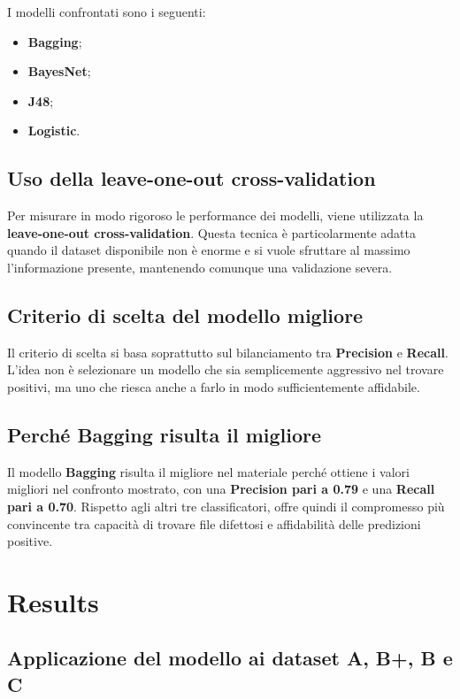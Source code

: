 I modelli confrontati sono i seguenti:

\begin{itemize}
    \item \textbf{Bagging};
    \item \textbf{BayesNet};
    \item \textbf{J48};
    \item \textbf{Logistic}.
\end{itemize}

\subsection{Uso della leave-one-out cross-validation}

Per misurare in modo rigoroso le performance dei modelli, viene utilizzata la \textbf{leave-one-out cross-validation}. Questa tecnica è particolarmente adatta quando il dataset disponibile non è enorme e si vuole sfruttare al massimo l'informazione presente, mantenendo comunque una validazione severa.

\subsection{Criterio di scelta del modello migliore}

Il criterio di scelta si basa soprattutto sul bilanciamento tra \textbf{Precision} e \textbf{Recall}. L'idea non è selezionare un modello che sia semplicemente aggressivo nel trovare positivi, ma uno che riesca anche a farlo in modo sufficientemente affidabile.

\subsection{Perché Bagging risulta il migliore}

Il modello \textbf{Bagging} risulta il migliore nel materiale perché ottiene i valori migliori nel confronto mostrato, con una \textbf{Precision pari a 0.79} e una \textbf{Recall pari a 0.70}. Rispetto agli altri tre classificatori, offre quindi il compromesso più convincente tra capacità di trovare file difettosi e affidabilità delle predizioni positive.

\section{Results}

\subsection{Applicazione del modello ai dataset A, B+, B e C}

